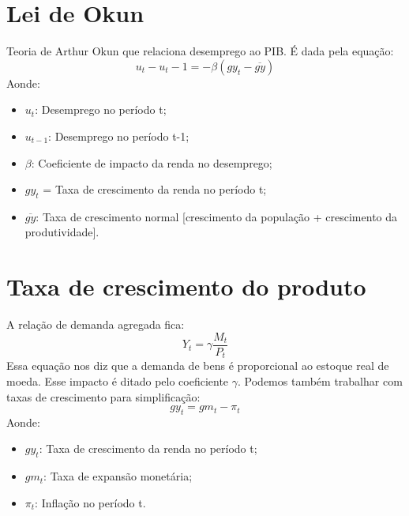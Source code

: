 \documentclass[12pt,a4paper,oneside,brazil]{abntex2}
\begin{document}
\section{Lei de Okun}
Teoria de Arthur Okun que relaciona desemprego ao PIB. É dada pela equação:
\[u_t - u_t-1 = -\beta (gy_t - \overline{gy})\]
Aonde: \begin{itemize}
\item $u_t$: Desemprego no período t;
\item $u_{t-1}$: Desemprego no período t-1;
\item $\beta$: Coeficiente de impacto da renda no desemprego;
\item $gy_t$ = Taxa de crescimento da renda no período t;
\item $\overline{gy}$: Taxa de crescimento normal [crescimento da população + crescimento da produtividade].
\end{itemize}

\section{Taxa de crescimento do produto}
A relação de demanda agregada fica:
\[ Y_t = \gamma \frac{M_t}{P_t}\]
Essa equação nos diz que a demanda de bens é proporcional ao estoque real de moeda. Esse impacto é ditado pelo coeficiente $\gamma$. Podemos também trabalhar com taxas de crescimento para simplificação:
\[gy_t = gm_t - \pi_t\] 
Aonde:
\begin{itemize}
\item $gy_t$: Taxa de crescimento da renda no período t;
\item $gm_t$: Taxa de expansão monetária;
\item $\pi_t$: Inflação no período t.
\end{itemize}
\end{document}

